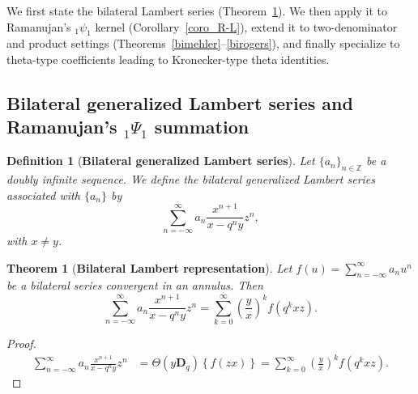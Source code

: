 \documentclass[12pt]{article}
\newcommand{\D}{\mathbf{D}}
\newcommand{\thp}{\Theta}
\newtheorem{theorem}{Theorem}
\newtheorem{definition}{Definition}
\begin{document}
We first state the bilateral Lambert series (Theorem~\ref{theo_BGL}).
We then apply it to Ramanujan's \({}_1\psi_1\) kernel (Corollary~\ref{coro_R-L}),
extend it to two-denominator and product settings (Theorems~\ref{bimehler}--\ref{birogers}),
and finally specialize to theta-type coefficients leading to Kronecker-type theta identities.


\subsection{Bilateral generalized Lambert series and Ramanujan’s ${}_{1}\Psi_{1}$ summation }

\begin{definition}[{\bf Bilateral generalized Lambert series}]
Let $\{a_n\}_{n\in\mathbb{Z}}$ be a doubly infinite sequence.
We define the bilateral generalized Lambert series associated with $\{a_n\}$ by
\begin{equation}
\sum_{n=-\infty}^{\infty}
a_n\frac{x^{n+1}}{x-q^ny}z^n,
\end{equation}
with $x\neq y$.
\end{definition}

\begin{theorem}[\bf Bilateral Lambert representation]\label{theo_BGL}
Let $f(u) = \sum_{n=-\infty}^{\infty}a_nu^n$ be a bilateral series convergent in an annulus. Then
\begin{equation}
    \sum_{n=-\infty}^{\infty}a_n \frac{x^{n+1}}{x-q^ny}z^n=
    \sum_{k=0}^{\infty}\left(\frac{y}{x}\right)^kf(q^k xz).
\end{equation}
\end{theorem}
\begin{proof}
\begin{align*}
    \sum_{n=-\infty}^{\infty}a_n \frac{x^{n+1}}{x-q^ny}z^n&=\thp(y\D_q)\left\{f(zx)\right\}=\sum_{k=0}^{\infty}\left(\frac{y}{x}\right)^kf(q^k xz).
\end{align*}   
\end{proof}
\end{document}
